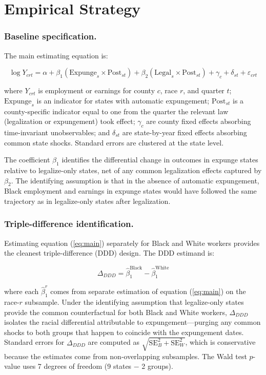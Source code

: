 \documentclass[12pt]{article}
\begin{document}
\section{Empirical Strategy}

\subsubsection*{Baseline specification.} The main estimating equation is:

\begin{equation}
\log Y_{crt} = \alpha + \beta_1 (\text{Expunge}_s \times \text{Post}_{st}) + \beta_2 (\text{Legal}_s \times \text{Post}_{st}) + \gamma_c + \delta_{st} + \varepsilon_{crt}
\label{eq:main}
\end{equation}

\noindent where $Y_{crt}$ is employment or earnings for county $c$, race $r$, and quarter $t$; $\text{Expunge}_s$ is an indicator for states with automatic expungement; $\text{Post}_{st}$ is a county-specific indicator equal to one from the quarter the relevant law (legalization or expungement) took effect; $\gamma_c$ are county fixed effects absorbing time-invariant unobservables; and $\delta_{st}$ are state-by-year fixed effects absorbing common state shocks. Standard errors are clustered at the state level.

The coefficient $\beta_1$ identifies the differential change in outcomes in expunge states relative to legalize-only states, net of any common legalization effects captured by $\beta_2$. The identifying assumption is that in the absence of automatic expungement, Black employment and earnings in expunge states would have followed the same trajectory as in legalize-only states after legalization.

\subsubsection*{Triple-difference identification.} Estimating equation (\ref{eq:main}) separately for Black and White workers provides the cleanest triple-difference (DDD) design. The DDD estimand is:

\begin{equation}
\Delta_{DDD} = \hat{\beta}_1^{\text{Black}} - \hat{\beta}_1^{\text{White}}
\label{eq:ddd}
\end{equation}

\noindent where each $\hat{\beta}_1^r$ comes from separate estimation of equation (\ref{eq:main}) on the race-$r$ subsample. Under the identifying assumption that legalize-only states provide the common counterfactual for both Black and White workers, $\Delta_{DDD}$ isolates the racial differential attributable to expungement---purging any common shocks to both groups that happen to coincide with the expungement dates. Standard errors for $\Delta_{DDD}$ are computed as $\sqrt{\text{SE}^2_B + \text{SE}^2_W}$, which is conservative because the estimates come from non-overlapping subsamples. The Wald test $p$-value uses 7 degrees of freedom (9 states $-$ 2 groups).
\end{document}

